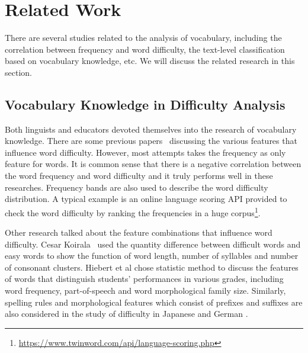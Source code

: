 \section{Related Work}
\label{sec:related}

There are several studies related to the analysis of vocabulary, including the correlation between frequency and word difficulty, the text-level classification based on vocabulary knowledge,  etc.
We will discuss the related research in this section.

\subsection{Vocabulary Knowledge in Difficulty Analysis}
Both linguists and educators devoted themselves into the research of vocabulary knowledge. 
There are some previous papers~\cite{koirala2015word,breland1996word,kirkpatrick1949vocabulary} discussing the various features that influence word difficulty. However, most attempts takes the frequency as only feature for words. 
It is common sense that there is a negative correlation between the word frequency and word difficulty and it truly performs well in these researches.
Frequency bands are also used to describe the word difficulty distribution.
A typical example is an online language scoring API provided to check the word difficulty by ranking the frequencies in a huge corpus\footnote{\url{https://www.twinword.com/api/language-scoring.php}}. 

Other research talked about the feature combinations that influence word difficulty.
Cesar Koirala~ used the quantity difference between difficult words and easy words to show the function of word length,  number of syllables and  number of consonant clusters.
Hiebert et al  chose statistic method to discuss the features of words that distinguish students’ performances in various grades, including word frequency, part-of-speech and word morphological family size.
Similarly, spelling rules and morphological features which consist of prefixes and suffixes are also considered in the study of difficulty in Japanese and German \cite{hancke2012readability,nakanishi2012estimating}.


